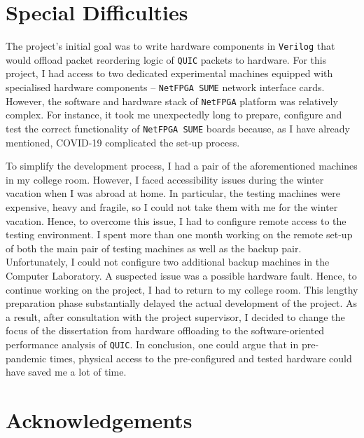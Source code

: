 \documentclass[12pt,a4paper]{report}
\begin{document}
\section*{Special Difficulties}

The project's initial goal was to write hardware components in \texttt{Verilog} that would offload packet reordering logic of \texttt{QUIC} packets to hardware.
For this project, I had access to two dedicated experimental machines equipped with specialised hardware components -- \texttt{NetFPGA SUME} network interface cards.
However, the software and hardware stack of \texttt{NetFPGA} platform was relatively complex.
For instance, it took me unexpectedly long to prepare, configure and test the correct functionality of \texttt{NetFPGA SUME} boards because, as I have already mentioned, COVID-19 complicated the set-up process.

To simplify the development process, I had a pair of the aforementioned machines in my college room.
However, I faced accessibility issues during the winter vacation when I was abroad at home.
In particular, the testing machines were expensive, heavy and fragile, so I could not take them with me for the winter vacation.
Hence, to overcome this issue, I had to configure remote access to the testing environment.
I spent more than one month working on the remote set-up of both the main pair of testing machines as well as the backup pair.
Unfortunately, I could not configure two additional backup machines in the Computer Laboratory.
A suspected issue was a possible hardware fault.
Hence, to continue working on the project, I had to return to my college room.
This lengthy preparation phase substantially delayed the actual development of the project.
As a result, after consultation with the project supervisor, I decided to change the focus of the dissertation from hardware offloading to the software-oriented performance analysis of \texttt{QUIC}. 
In conclusion, one could argue that in pre-pandemic times, physical access to the pre-configured and tested hardware could have saved me a lot of time.






\tableofcontents

\listoffigures

\newpage
\section*{Acknowledgements}
\end{document}
